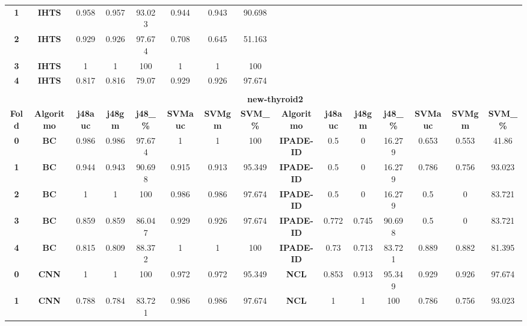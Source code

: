 {{\begin{tabular}{c|c|cccccc|ccccccc}
\textbf{1} & \textbf{IHTS} & 0.958 & 0.957 & 93.023 & 0.944 & 0.943 & 90.698 &       &       &       &       &       &       &  \\
\textbf{2} & \textbf{IHTS} & 0.929 & 0.926 & 97.674 & 0.708 & 0.645 & 51.163 &       &       &       &       &       &       &  \\
\textbf{3} & \textbf{IHTS} & 1     & 1     & 100   & 1     & 1     & 100   &       &       &       &       &       &       &  \\
\textbf{4} & \textbf{IHTS} & 0.817 & 0.816 & 79.07 & 0.929 & 0.926 & 97.674 &       &       &       &       &       &       &  \\
\multicolumn{1}{c}{} & \multicolumn{1}{c}{} &       &       &       &       &       & \multicolumn{1}{c}{} &       &       &       &       &       &       &  \\
\multicolumn{1}{c}{} & \multicolumn{14}{c}{\textbf{new-thyroid2}} \\
\midrule
\textbf{Fold} & \textbf{Algoritmo} & \textbf{j48auc} & \textbf{j48gm} & \textbf{j48\_\%} & \textbf{SVMauc} & \textbf{SVMgm} & \textbf{SVM\_\%} & \multicolumn{1}{c|}{\textbf{Algoritmo}} & \textbf{j48auc} & \textbf{j48gm} & \textbf{j48\_\%} & \textbf{SVMauc} & \textbf{SVMgm} & \textbf{SVM\_\%} \\
\midrule
\textbf{0} & \textbf{BC} & 0.986 & 0.986 & 97.674 & 1     & 1     & 100   & \multicolumn{1}{c|}{\textbf{IPADE-ID}} & 0.5   & 0     & 16.279 & 0.653 & 0.553 & 41.86 \\
\textbf{1} & \textbf{BC} & 0.944 & 0.943 & 90.698 & 0.915 & 0.913 & 95.349 & \multicolumn{1}{c|}{\textbf{IPADE-ID}} & 0.5   & 0     & 16.279 & 0.786 & 0.756 & 93.023 \\
\textbf{2} & \textbf{BC} & 1     & 1     & 100   & 0.986 & 0.986 & 97.674 & \multicolumn{1}{c|}{\textbf{IPADE-ID}} & 0.5   & 0     & 16.279 & 0.5   & 0     & 83.721 \\
\textbf{3} & \textbf{BC} & 0.859 & 0.859 & 86.047 & 0.929 & 0.926 & 97.674 & \multicolumn{1}{c|}{\textbf{IPADE-ID}} & 0.772 & 0.745 & 90.698 & 0.5   & 0     & 83.721 \\
\textbf{4} & \textbf{BC} & 0.815 & 0.809 & 88.372 & 1     & 1     & 100   & \multicolumn{1}{c|}{\textbf{IPADE-ID}} & 0.73  & 0.713 & 83.721 & 0.889 & 0.882 & 81.395 \\
\textbf{0} & \textbf{CNN} & 1     & 1     & 100   & 0.972 & 0.972 & 95.349 & \multicolumn{1}{c|}{\textbf{NCL}} & 0.853 & 0.913 & 95.349 & 0.929 & 0.926 & 97.674 \\
\textbf{1} & \textbf{CNN} & 0.788 & 0.784 & 83.721 & 0.986 & 0.986 & 97.674 & \multicolumn{1}{c|}{\textbf{NCL}} & 1     & 1     & 100   & 0.786 & 0.756 & 93.023 \\

\end{tabular}}}

